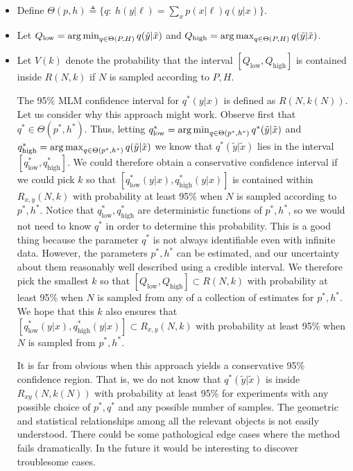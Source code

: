 \begin{itemize}
    \item Define $\Theta(p,h) \triangleq \{q:\ h(y|\ell)=\sum_x p(x|\ell)q(y|x) \}$.  
    \item Let $Q_\mathrm{low} = \operatorname*{arg\,min}_{q\in\Theta(P,H)} q(\tilde y|\tilde x)$ and $Q_\mathrm{high} = \operatorname*{arg\,max}_{q\in\Theta(P,H)} q(\tilde y|\tilde x)$.
    \item Let $V(k)$ denote the probability that the interval $[Q_\mathrm{low},Q_\mathrm{high}]$ is contained inside $R(N,k)$ if $N$ is sampled according to $P,H$.  


The 95\% MLM confidence interval for $q^*(y|x)$ is defined as $R(N,k(N))$.  Let us consider why this approach might work.  Observe first that $q^* \in \Theta(p^*,h^*)$.  Thus, letting $q^*_\mathrm{low} = \operatorname*{arg\,min}_{q\in\Theta(p^*,h^*)} q^*(\tilde y|\tilde x)$ and $q^*_\mathrm{high} = \operatorname*{arg\,max}_{q\in\Theta(p^*,h^*)} q(\tilde y|\tilde x)$ we know that $q^*(\tilde y|\tilde x)$ lies in the interval $[q^*_\mathrm{low},q^*_\mathrm{high}]$.  We could therefore obtain a conservative confidence interval if we could pick $k$ so that $[q^*_\mathrm{low}(y|x),q^*_\mathrm{high}(y|x)]$ is contained within $R_{x,y}(N,k)$ with probability at least 95\% when $N$ is sampled according to $p^*,h^*$.  Notice that $q^*_\mathrm{low},q^*_\mathrm{high}$ are deterministic functions of $p^*,h^*$, so we would not need to know $q^*$ in order to determine this probability.  This is a good thing because the parameter $q^*$ is not always identifiable even with infinite data.  However, the parameters $p^*,h^*$ can be estimated, and our uncertainty about them reasonably well described using a credible interval.  We therefore pick the smallest $k$ so that $[Q_\mathrm{low},Q_\mathrm{high}] \subset R(N,k)$ with probability at least 95\% when $N$ is sampled from any of a collection of estimates for $p^*,h^*$.  We hope that this $k$ also ensures that $[q^*_\mathrm{low}(y|x),q^*_\mathrm{high}(y|x)] \subset R_{x,y}(N,k)$ with probability at least 95\% when $N$ is sampled from $p^*,h^*$.  

It is far from obvious when this approach yields a conservative 95\% confidence region.  That is, we do not know that $q^*(\tilde y|\tilde x)$ is inside $R_{x y}(N,k(N))$ with probability at least 95\% for experiments with any possible choice of $p^*,q^*$ and any possible number of samples.  The geometric and statistical relationships among all the relevant objects is not easily understood.  There could be some pathological edge cases where the method fails dramatically.  In the future it would be interesting to discover troublesome cases.  


\end{itemize}
